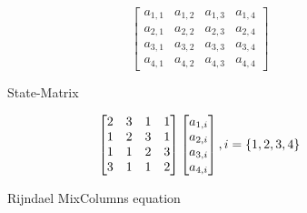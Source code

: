 \begin{figure}
  \begin{equation}
    \begin{bmatrix}
      a_{1, 1} & a_{1, 2} & a_{1, 3} & a_{1, 4} \\
      a_{2, 1} & a_{2, 2} & a_{2, 3} & a_{2, 4} \\
      a_{3, 1} & a_{3, 2} & a_{3, 3} & a_{3, 4} \\
      a_{4, 1} & a_{4, 2} & a_{4, 3} & a_{4, 4}
    \end{bmatrix}
  \end{equation}
  \caption{State-Matrix}
  \label{matrix:state}
\end{figure}

\begin{figure}
  \begin{equation}
    \begin{bmatrix}
      2 & 3 & 1 & 1 \\
      1 & 2 & 3 & 1 \\
      1 & 1 & 2 & 3 \\
      3 & 1 & 1 & 2
    \end{bmatrix}
    \*
    \begin{bmatrix}
      a_{1,i} \\ 
      a_{2,i} \\
      a_{3,i} \\
      a_{4,i}
    \end{bmatrix}
    ,i = \{1,2,3,4\}
  \end{equation}
  \caption{Rijndael MixColumns equation}
  \label{matrix:rijMix}
\end{figure}

